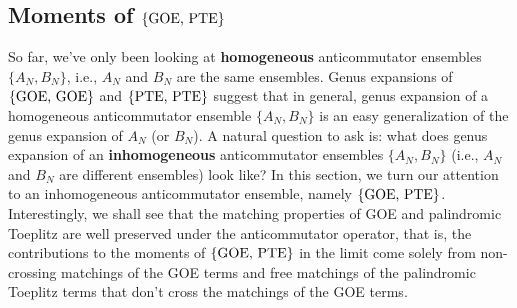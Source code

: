 \documentclass[11pt,reqno]{amsart}
\numberwithin{equation}{section}
\theoremstyle{plain}
\begin{document}

\subsection{Moments of $\{\textup{GOE, PTE}\}$}\label{subsectionGOEpalindromicToeplitz}
So far, we've only been looking at \textbf{homogeneous} anticommutator ensembles $\{A_N, B_N\}$, i.e., $A_N$ and $B_N$ are the same ensembles. Genus expansions of $\{\textup{GOE, GOE}\}$ and $\{\textup{PTE, PTE}\}$ suggest that in general, genus expansion of a homogeneous anticommutator ensemble $\{A_N, B_N\}$ is an easy generalization of the genus expansion of $A_N$ (or $B_N$). A natural question to ask is: what does genus expansion of an \textbf{inhomogeneous} anticommutator ensembles $\{A_N, B_N\}$ (i.e., $A_N$ and $B_N$ are different ensembles) look like? In this section, we turn our attention to an inhomogeneous anticommutator ensemble, namely $\{\textup{GOE, PTE}\}$. Interestingly, we shall see that the matching properties of GOE and palindromic Toeplitz are well preserved under the anticommutator operator, that is, the contributions to the moments of $\{\textup{GOE, PTE}\}$ in the limit come solely from non-crossing matchings of the GOE terms and free matchings of the palindromic Toeplitz terms that don't cross the matchings of the GOE terms.
\end{document}
